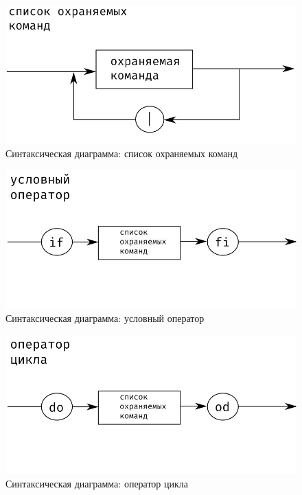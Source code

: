     \begin{figure}[H]
	\begin{center}
		\includegraphics[scale=0.7]{my_folder/images/virth/command_list}
		\caption{Синтаксическая диаграмма: список охраняемых команд}
	\end{center}
    \end{figure}
    
    \begin{figure}[H]
	\begin{center}
		\includegraphics[scale=0.7]{my_folder/images/virth/if}
		\caption{Синтаксическая диаграмма: условный оператор}
	\end{center}
    \end{figure}
    
    \begin{figure}[H]
	\begin{center}
		\includegraphics[scale=0.7]{images/virth/do}
		\caption{Синтаксическая диаграмма: оператор цикла}
	\end{center}
    \end{figure}

